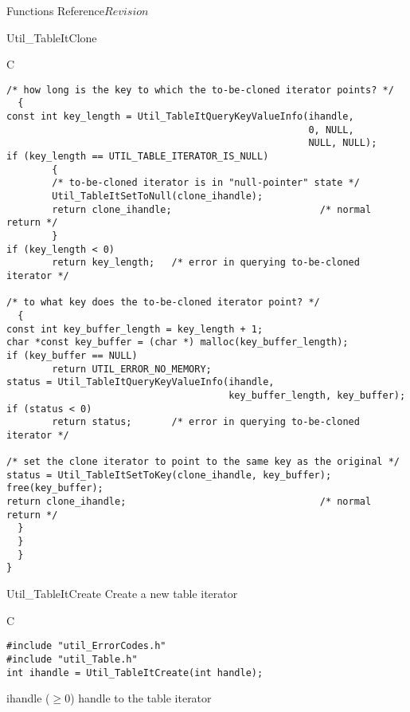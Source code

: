 \begin{cactuspart}{ Functions Reference}{}{$Revision$}
\begin{FunctionDescription}{Util\_TableItClone}
\begin{ExampleSection}
\begin{Example}{C}
\begin{verbatim}
/* how long is the key to which the to-be-cloned iterator points? */
  {
const int key_length = Util_TableItQueryKeyValueInfo(ihandle,
                                                     0, NULL,
                                                     NULL, NULL);
if (key_length == UTIL_TABLE_ITERATOR_IS_NULL)
        {
        /* to-be-cloned iterator is in "null-pointer" state */
        Util_TableItSetToNull(clone_ihandle);
        return clone_ihandle;                          /* normal return */
        }
if (key_length < 0)
        return key_length;   /* error in querying to-be-cloned iterator */

/* to what key does the to-be-cloned iterator point? */
  {
const int key_buffer_length = key_length + 1;
char *const key_buffer = (char *) malloc(key_buffer_length);
if (key_buffer == NULL)
        return UTIL_ERROR_NO_MEMORY;
status = Util_TableItQueryKeyValueInfo(ihandle,
                                       key_buffer_length, key_buffer);
if (status < 0)
        return status;       /* error in querying to-be-cloned iterator */

/* set the clone iterator to point to the same key as the original */
status = Util_TableItSetToKey(clone_ihandle, key_buffer);
free(key_buffer);
return clone_ihandle;                                  /* normal return */
  }
  }
  }
}
\end{verbatim}
\end{Example}
\end{ExampleSection}
\end{FunctionDescription}


\begin{FunctionDescription}{Util\_TableItCreate}
\label{Util-TableItCreate}
Create a new table iterator

\begin{SynopsisSection}
\begin{Synopsis}{C}
\begin{verbatim}
#include "util_ErrorCodes.h"
#include "util_Table.h"
int ihandle = Util_TableItCreate(int handle);
\end{verbatim}
\end{Synopsis}
\end{SynopsisSection}

\begin{ResultSection}
\begin{Result}{ihandle ($\ge 0$)}
handle to the table iterator
\end{Result}
\end{ResultSection}


\end{FunctionDescription}
\end{cactuspart}
